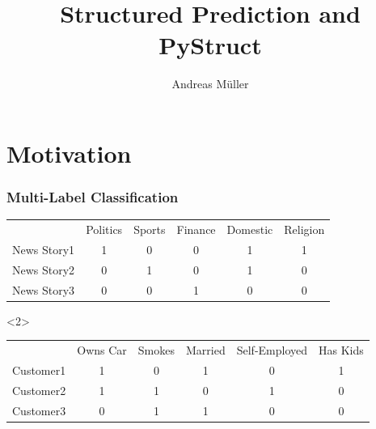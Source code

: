 \documentclass{beamer}
\title{Structured Prediction and PyStruct}
\author[short]{Andreas M\"uller}%
\begin{document}
	\begin{frame}[plain]
		\titlepage
	\end{frame}

    \section{Motivation}
    \begin{frame}
        \frametitle{Multi-Label Classification}

        \begin{table}
            \begin{tabularx}{\linewidth}{lccccc}
                \toprule
                & \footnotesize{Politics} & \footnotesize{Sports} & \footnotesize{Finance} & \footnotesize{Domestic} & \footnotesize{Religion}\\
                \cmidrule{2-6}
                News Story1 & 1 & 0 & 0 & 1 & 1\\
                News Story2 & 0 & 1 & 0 & 1 & 0\\
                News Story3 & 0 & 0 & 1 & 0 & 0\\
                \bottomrule
            \end{tabularx}
        \end{table}

        \begin{visibleenv}<2>
        \begin{table}
            \begin{tabularx}{\linewidth}{lccccc}
                \toprule
                & \footnotesize{Owns Car} & \footnotesize{Smokes} & \footnotesize{Married} & \footnotesize{Self-Employed} & \footnotesize{Has Kids}\\
                \cmidrule{2-6}
                Customer1 & 1 & 0 & 1 & 0 & 1\\
                Customer2 & 1 & 1 & 0 & 1 & 0\\
                Customer3 & 0 & 1 & 1 & 0 & 0\\
                \bottomrule
            \end{tabularx}
        \end{table}
        \end{visibleenv}
        
    \end{frame}
\end{document}
